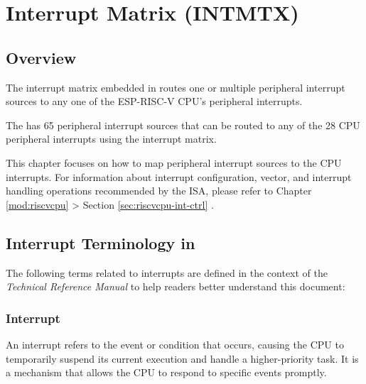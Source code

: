 \documentclass[main\_\_EN.tex]{subfiles}
\begin{document}

\ifglobal
\else
    {\let\clearpage\relax \listoftodos}
    {\let\clearpage\relax \listofdonetodos}
    \tableofcontents
\fi



\hypertarget{intmtrx}{}
\chapter{Interrupt Matrix (INTMTX)}
\label{mod:intmtrx}
\section{Overview}

The interrupt matrix embedded in \chipname{} routes one or multiple peripheral interrupt sources to any one of the ESP-RISC-V CPU's peripheral interrupts.

The \chipname{} has 65 peripheral interrupt sources that can be routed to any of the 28 CPU peripheral interrupts using the interrupt matrix.
\begin{tiplisting}
This chapter focuses on how to map peripheral interrupt sources to the CPU interrupts. For information about interrupt configuration, vector, and interrupt handling operations recommended by the ISA, please refer to Chapter \ref{mod:riscvcpu} \textit{}  > Section \ref{sec:riscvcpu-int-ctrl} \textit{}.
\end{tiplisting}
\vspace{-1em}

\section{Interrupt Terminology in \chipname{}}\label{sec:intmtx-int-terminology}

The following terms related to interrupts are defined in the context of the \textit{\chipname{} Technical Reference Manual} to help readers better understand this document:

\subsection{Interrupt}
An interrupt refers to the event or condition that occurs, causing the CPU to temporarily suspend its current execution and handle a higher-priority task. It is a mechanism that allows the CPU to respond to specific events promptly.
\end{document}
